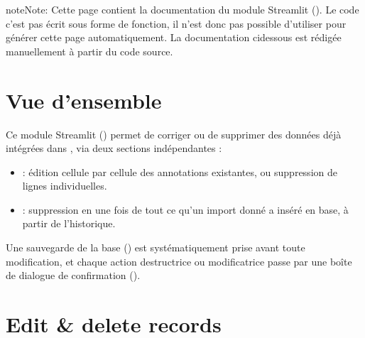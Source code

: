 \documentclass[letterpaper,10pt,english]{sphinxmanual}
\begin{document}
\begin{sphinxadmonition}{note}{Note:}
\sphinxAtStartPar
Cette page contient la documentation du module Streamlit ().
Le code c’est pas écrit sous forme de fonction, il n’est donc pas possible d’utiliser 
pour générer cette page automatiquement. La documentation ci\sphinxhyphen{}dessous est rédigée manuellement
à partir du code source.
\end{sphinxadmonition}


\section{Vue d’ensemble}
\label{\detokenize{5_Management:vue-d-ensemble}}
\sphinxAtStartPar
Ce module Streamlit () permet de corriger ou de supprimer des données déjà
intégrées dans , via deux sections indépendantes :
\begin{itemize}
\item {} 
\sphinxAtStartPar
{} : édition cellule par cellule des annotations existantes, ou
suppression de lignes individuelles.

\item {} 
\sphinxAtStartPar
{} : suppression en une fois de tout ce qu’un import donné a inséré
en base, à partir de l’historique.

\end{itemize}

\sphinxAtStartPar
Une sauvegarde de la base () est systématiquement prise
avant toute modification, et chaque action destructrice ou modificatrice passe par une boîte de
dialogue de confirmation ().


\section{Edit \& delete records}
\label{\detokenize{5_Management:edit-delete-records}}
\end{document}
